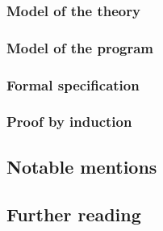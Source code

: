 \subsubsection{Model of the theory}\label{S:ex_theory}

\subsubsection{Model of the program}\label{S:ex_program}

\subsubsection{Formal specification}\label{S:ex_spec}

\subsubsection{Proof by induction}\label{S:ex_ind}

\subsection{Notable mentions}\label{S:ex_notable}

\subsection{Further reading}\label{S:ex_reading}
